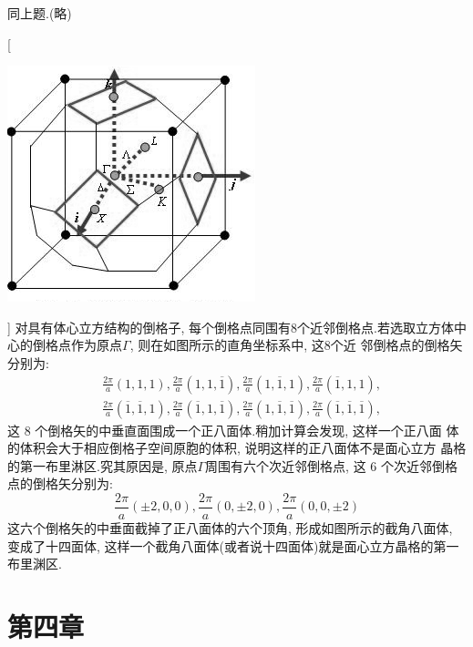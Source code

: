 \documentclass[UTF8,10pt, a4paper, oneside]{ctexart}
\begin{document}
    {同上题.(略)}

    [ \begin{center}
        \includegraphics{picture/3-12.png}
    \end{center}]
    {对具有体心立方结构的倒格子, 每个倒格点同围有8个近邻倒格点.若选取立方体中心的倒格点作为原点$\Gamma$, 则在如图所示的直角坐标系中, 这8个近 邻倒格点的倒格矢分别为:
        \[\begin{aligned}
            &\frac{2 \pi}{a}(1,1,1), \frac{2 \pi}{a}(1,1, \overline{1}), \frac{2 \pi}{a}(1, \overline{1}, 1), \frac{2 \pi}{a}(\overline{1}, 1,1), \\
            &\frac{2 \pi}{a}(\overline{1}, \overline{1}, 1), \frac{2 \pi}{a}(\overline{1}, 1, \overline{1}), \frac{2 \pi}{a}(1, \overline{1}, \overline{1}), \frac{2 \pi}{a}(\overline{1}, \overline{1}, \overline{1}),
            \end{aligned}\]这 8 个倒格矢的中垂直面围成一个正八面体.稍加计算会发现, 这样一个正八面 体的体积会大于相应倒格子空间原胞的体积, 说明这样的正八面体不是面心立方 晶格的第一布里淋区.究其原因是, 原点$\Gamma$周围有六个次近邻倒格点, 这 6 个次近邻倒格点的倒格矢分别为:
            \[\frac{2 \pi}{a}(\pm 2,0,0), \frac{2 \pi}{a}(0, \pm 2,0), \frac{2 \pi}{a}(0,0, \pm 2)\]这六个倒格矢的中垂面截掉了正八面体的六个顶角, 形成如图所示的截角八面体, 变成了十四面体, 这样一个截角八面体(或者说十四面体)就是面心立方晶格的第一布里渊区.}


\section{第四章}

\end{document}
